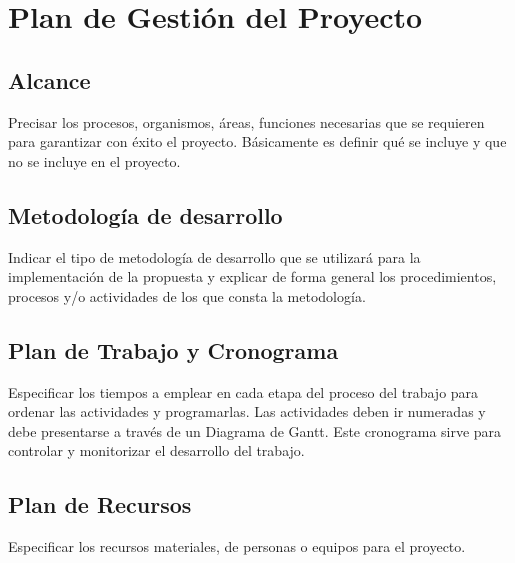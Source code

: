 \chapter{Plan de Gestión del Proyecto}

\section{Alcance}

Precisar los procesos, organismos, áreas, funciones necesarias que se requieren para garantizar con éxito el proyecto. Básicamente es definir qué se incluye y que no se incluye en el proyecto.

\section{Metodología de desarrollo}

Indicar el tipo de metodología de desarrollo que se utilizará para la implementación de la propuesta y explicar de forma general los procedimientos, procesos y/o actividades de los que consta la metodología.

\section{Plan de Trabajo y Cronograma}

Especificar los tiempos a emplear en cada etapa del proceso del trabajo para ordenar las actividades y programarlas. Las actividades deben ir numeradas y debe presentarse a través de un Diagrama de Gantt. Este cronograma sirve para controlar y monitorizar el desarrollo del trabajo.

\section{Plan de Recursos}

Especificar los recursos materiales, de personas o equipos para el proyecto. \cite{einstein}